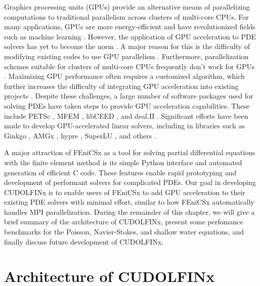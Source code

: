 Graphics processing units (GPUs) provide an alternative means of parallelizing computations to traditional parallelism across clusters of multi-core CPUs. For many applications, GPUs are more energy-efficient and have revolutionized fields such as machine learning \cite{navarro2014survey}. However, the application of GPU acceleration to PDE solvers has yet to become the norm \cite{fu2014architecting}. A major reason for this is the difficulty of modifying existing codes to use GPU parallelism \cite{MILLS2021102831}. Furthermore, parallelization schemes suitable for clusters of multi-core CPUs frequently don't work for GPUs \cite{MACIOL20101093}. Maximizing GPU performance often requires a customized algorithm, which further increases the difficulty of integrating GPU acceleration into existing projects \cite{mittal2015survey}. Despite these challenges, a large number of software packages used for solving PDEs have taken steps to provide GPU acceleration capabilities. These include PETSc \cite{MILLS2021102831}, MFEM \cite{anderson2021mfem}, libCEED \cite{abdelfattah2021gpu}, and deal.II \cite{arndt2021deal}. Significant efforts have been made to develop GPU-accelerated linear solvers, including in libraries such as Ginkgo \cite{ginkgo-toms-2022}, AMGx \cite{naumov2015amgx}, hypre \cite{li2020efficient, falgout2021porting}, SuperLU \cite{li2023newly}, and others \cite{lu2023tilesptrsv}.

A major attraction of FEniCSx \cite{baratta2023dolfinx} as a tool for solving partial differential equations with the finite element method is its simple Python interface and automated generation of efficient C code. These features enable rapid prototyping and development of performant solvers for complicated PDEs. Our goal in developing CUDOLFINx is to enable users of FEniCSx to add GPU acceleration to their existing PDE solvers with minimal effort, similar to how FEniCSx automatically handles MPI parallelization. During the remainder of this chapter, we will give a brief summary of the architecture of CUDOLFINx, present some perfomance benchmarks for the Poisson, Navier-Stokes, and shallow water equations, and finally discuss future development of CUDOLFINx. 

\section*{Architecture of CUDOLFINx}

